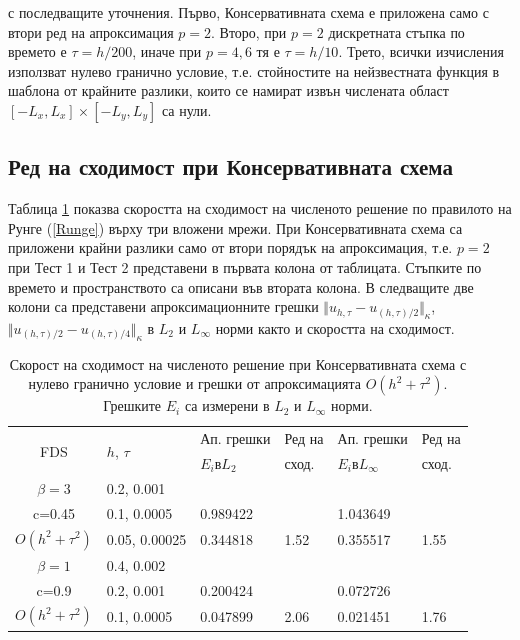 \documentclass{article}
\newcommand{\rf}[1]{(\ref{#1})}
\begin{document}
с последващите уточнения. Първо, Консервативната схема е приложена само с втори ред на апроксимация  $p=2$. Второ, при $p=2$ дискретната стъпка по времето е 
 $\tau=h/200$, иначе при $p=4, 6$ тя е $\tau = h/10$. Трето, всички изчисления използват нулево гранично условие, т.е. стойностите на нейзвестната функция в шаблона от крайните разлики, които се намират извън числената област $[-L_x, L_x] \times [-L_y, L_y]$ са нули.

\subsection{Ред на сходимост при Консервативната схема}

Таблица \ref{tableC} показва скоростта на сходимост на численото решение по правилото на Рунге \rf{Runge} върху три вложени мрежи. При Консервативната схема са приложени крайни разлики само от втори порядък на апроксимация, т.е. $p=2$ при Тест 1 и Тест 2 представени в първата колона от таблицата. Стъпките по времето и пространството са описани във втората колона. В следващите две колони са представени апроксимационните грешки  $\Vert u_{h,\tau} - u_{(h,\tau)/2} \Vert_\kappa$, $\Vert  u_{(h,\tau)/2} - u_{(h,\tau)/4} \Vert_\kappa$ в $L_2$ и $L_{\infty}$ норми както и скоростта на сходимост.

\begin{table}[ht]
\centering
\small
		\begin{tabular}{||c|l|ll|ll||}
			\hline
			\hline
      \multirow{2  }{*}{FDS}        & \multirow{2  }{*}{$h$, $\tau$}  & Ап. грешки      &Ред на& Ап. грешки        &Ред на   \\
	                                        &                                                     &  $E_i$в$L_2$ &  сход. & $E_i$в$L_\infty$  & сход. \\
   			\hline 
					\hline 
  $\beta=3$                &0.2, 0.001         &                    &                &                  &                   \\
   c=0.45                     &0.1, 0.0005         & 0.989422   &                & 1.043649  &                   \\
     $O(h^2 + \tau^ 2)$ &0.05, 0.00025  &0.344818    & 1.52       & 0.355517   &   1.55   \\
	   \hline
			\hline 
       $\beta=1$           & 0.4, 0.002       &                   &           &                 &   \\
                  c=0.9       & 0.2, 0.001        & 0.200424   &          &0.072726  &   \\
  $O(h^2+ \tau^2)$  & 0.1, 0.0005       & 0.047899   & 2.06  &0.021451  & 1.76 \\
	   \hline
			\hline 
		\end{tabular}
		\caption{Скорост на сходимост на численото решение при Консервативната схема с нулево гранично условие и грешки от апроксимацията $O(h^{2} + \tau^2 )$. Грешките $E_i$ са измерени в $L_2$ и $L_\infty$ норми.}
\label{tableC}
\end{table}
\end{document}
